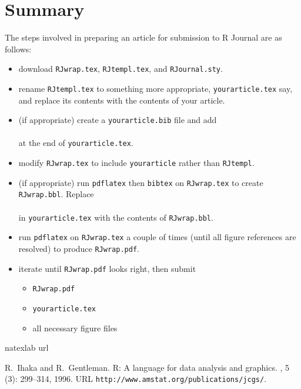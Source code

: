 \section*{Summary}

The steps involved in preparing an article for submission to R Journal
are as follows:

\begin{itemize}
\setlength{\itemsep}{0in}
\item download {\tt RJwrap.tex}, {\tt RJtempl.tex}, and {\tt RJournal.sty}.
\item rename {\tt RJtempl.tex} to something more appropriate,
{\tt yourarticle.tex} say, and replace its
contents with the contents of your article.
\item (if appropriate) create a {\tt yourarticle.bib} file
and add \\
\verb||\\
at the end of {\tt yourarticle.tex}.  
\item modify {\tt RJwrap.tex} to include {\tt yourarticle} rather
than {\tt RJtempl}.
\item (if appropriate) run {\tt pdflatex} then
 {\tt bibtex} on {\tt RJwrap.tex}
to create {\tt RJwrap.bbl}. Replace \\
\verb||\\
in {\tt yourarticle.tex} with
the contents of {\tt RJwrap.bbl}.
\item run {\tt pdflatex} on {\tt RJwrap.tex} a couple of times
(until all figure references are resolved) to produce {\tt RJwrap.pdf}.
\item iterate until {\tt RJwrap.pdf} looks right, then submit
  \begin{itemize}
  \item {\tt RJwrap.pdf}
  \item {\tt yourarticle.tex}
  \item all necessary figure files 
  \end{itemize}
\end{itemize}


\begin{thebibliography}{1}
\expandafter\ifx\csname natexlab\endcsname\relax\def\natexlab#1{#1}\fi
\expandafter\ifx\csname url\endcsname\relax
  \def\url#1{{\tt #1}}\fi

R.~Ihaka and R.~Gentleman.
\newblock R: A language for data analysis and graphics.
, 5
  (3): 299--314, 1996.
\newblock URL \url{http://www.amstat.org/publications/jcgs/}.

\end{thebibliography}
